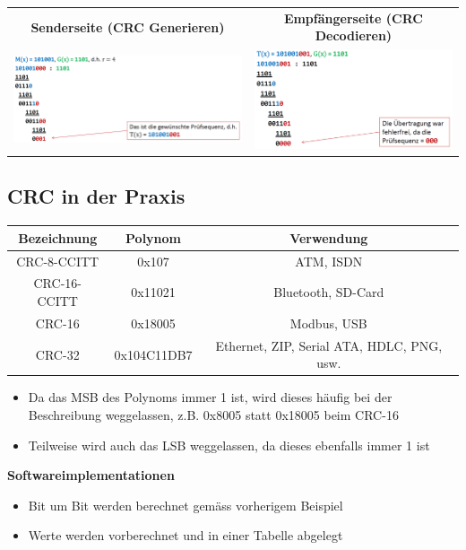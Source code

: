 \begin{tabular}{c|c}
	\textbf{Senderseite (CRC Generieren)} & \textbf{Empfängerseite (CRC Decodieren)} \\
	\includegraphics[width=10cm]{images/CRC/crc-gen.png} & \includegraphics[width=8cm]{images/CRC/crc-enc.png}  \\
\end{tabular}

\subsection{CRC in der Praxis}
\begin{tabular}{|c|c|c|}
\hline \textbf{Bezeichnung} & \textbf{Polynom} & \textbf{Verwendung} \\
\hline CRC-8-CCITT & 0x107 &  ATM, ISDN\\
\hline CRC-16-CCITT & 0x11021 & Bluetooth, SD-Card \\
\hline  CRC-16 & 0x18005  &  Modbus, USB\\
\hline  CRC-32 & 0x104C11DB7 & Ethernet, ZIP, Serial ATA, HDLC, PNG, usw. \\
\hline
\end{tabular}

\begin{itemize}
	\item Da das MSB des Polynoms immer 1 ist, wird dieses häufig bei der Beschreibung weggelassen, z.B. 0x8005 statt 0x18005 beim CRC-16
	\item Teilweise wird auch das LSB weggelassen, da dieses ebenfalls immer 1 ist
\end{itemize}

\textbf{Softwareimplementationen}
\begin{itemize}
	\item Bit um Bit werden berechnet gemäss vorherigem Beispiel
	\item Werte werden vorberechnet und in einer Tabelle abgelegt
\end{itemize}

